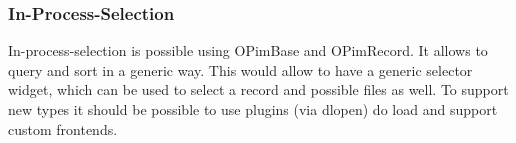 \subsubsection{In-Process-Selection}
In-process-selection is possible using OPimBase 
and OPimRecord. It allows to query and sort in a generic way.
This would allow to have a generic selector widget, which
can be used to select a record and possible files as well. To
support new types it should be possible to use plugins (via dlopen) do load
and support custom frontends.
